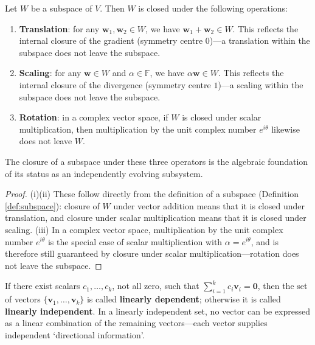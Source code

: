 \begin{proposition}\label{prop:subspace_closure_symmetry}
Let $W$ be a subspace of $V$. Then $W$ is closed under the following operations:
\begin{enumerate}[label=(\roman*)]
    \item \textbf{Translation}: for any $\mathbf{w}_1, \mathbf{w}_2 \in W$, we have $\mathbf{w}_1 + \mathbf{w}_2 \in W$. This reflects the internal closure of the gradient (symmetry centre $0$)---a translation within the subspace does not leave the subspace.
    \item \textbf{Scaling}: for any $\mathbf{w} \in W$ and $\alpha \in \mathbb{F}$, we have $\alpha \mathbf{w} \in W$. This reflects the internal closure of the divergence (symmetry centre $1$)---a scaling within the subspace does not leave the subspace.
    \item \textbf{Rotation}: in a complex vector space, if $W$ is closed under scalar multiplication, then multiplication by the unit complex number $e^{i\theta}$ likewise does not leave $W$.
\end{enumerate}
The closure of a subspace under these three operators is the algebraic foundation of its status as an independently evolving subsystem.
\end{proposition}

\begin{proof}
(i)(ii) These follow directly from the definition of a subspace (Definition \ref{def:subspace}): closure of $W$ under vector addition means that it is closed under translation, and closure under scalar multiplication means that it is closed under scaling. (iii) In a complex vector space, multiplication by the unit complex number $e^{i\theta}$ is the special case of scalar multiplication with $\alpha = e^{i\theta}$, and is therefore still guaranteed by closure under scalar multiplication---rotation does not leave the subspace.
\end{proof}

\begin{definition}\label{def:linear_dependence}
If there exist scalars $c_1, \dots, c_k$, not all zero, such that $\sum_{i=1}^k c_i \mathbf{v}_i = \mathbf{0}$, then the set of vectors $\{\mathbf{v}_1, \dots, \mathbf{v}_k\}$ is called \textbf{linearly dependent}; otherwise it is called \textbf{linearly independent}. In a linearly independent set, no vector can be expressed as a linear combination of the remaining vectors---each vector supplies independent `directional information'.
\end{definition}

